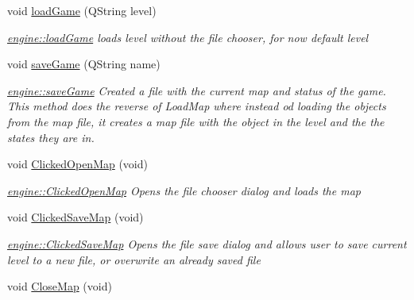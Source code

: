 \begin{DoxyCompactItemize}
\item 
\hypertarget{classengine_a4e8515e2f893531685ab028f42567137}{void \hyperlink{classengine_a4e8515e2f893531685ab028f42567137}{load\-Game} (Q\-String level)}\label{classengine_a4e8515e2f893531685ab028f42567137}

\begin{DoxyCompactList}\small\item\em \hyperlink{classengine_a4e8515e2f893531685ab028f42567137}{engine\-::load\-Game} loads level without the file chooser, for now default level \end{DoxyCompactList}\item 
\hypertarget{classengine_a6e3fca96515e269117b4cc46750f363e}{void \hyperlink{classengine_a6e3fca96515e269117b4cc46750f363e}{save\-Game} (Q\-String name)}\label{classengine_a6e3fca96515e269117b4cc46750f363e}

\begin{DoxyCompactList}\small\item\em \hyperlink{classengine_a6e3fca96515e269117b4cc46750f363e}{engine\-::save\-Game} Created a file with the current map and status of the game. This method does the reverse of Load\-Map where instead od loading the objects from the map file, it creates a map file with the object in the level and the the states they are in. \end{DoxyCompactList}\item 
\hypertarget{classengine_a02ad5e7f4d1073a97f77d153c9685ff8}{void \hyperlink{classengine_a02ad5e7f4d1073a97f77d153c9685ff8}{Clicked\-Open\-Map} (void)}\label{classengine_a02ad5e7f4d1073a97f77d153c9685ff8}

\begin{DoxyCompactList}\small\item\em \hyperlink{classengine_a02ad5e7f4d1073a97f77d153c9685ff8}{engine\-::\-Clicked\-Open\-Map} Opens the file chooser dialog and loads the map \end{DoxyCompactList}\item 
\hypertarget{classengine_ae322ec44826013a47ac954f9b8fc24b2}{void \hyperlink{classengine_ae322ec44826013a47ac954f9b8fc24b2}{Clicked\-Save\-Map} (void)}\label{classengine_ae322ec44826013a47ac954f9b8fc24b2}

\begin{DoxyCompactList}\small\item\em \hyperlink{classengine_ae322ec44826013a47ac954f9b8fc24b2}{engine\-::\-Clicked\-Save\-Map} Opens the file save dialog and allows user to save current level to a new file, or overwrite an already saved file \end{DoxyCompactList}\item 
\hypertarget{classengine_a68b46ec574d97c62f29206fd201b34b5}{void \hyperlink{classengine_a68b46ec574d97c62f29206fd201b34b5}{Close\-Map} (void)}\label{classengine_a68b46ec574d97c62f29206fd201b34b5}


\end{DoxyCompactItemize}
